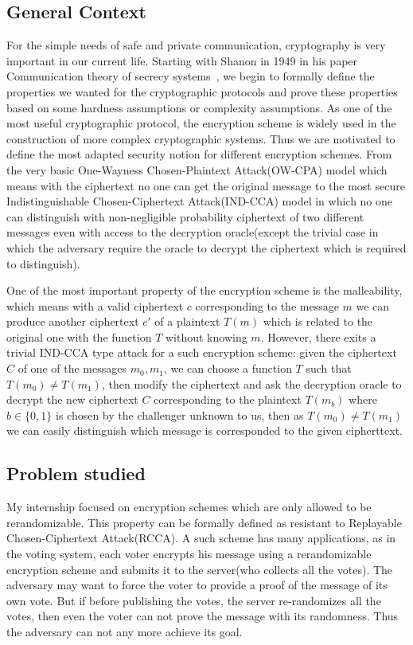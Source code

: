 \subsection*{General Context}

For the simple needs of safe and private communication, cryptography is very important in our current life. 
Starting with Shanon in 1949 in his paper Communication theory of secrecy systems~\cite{shannon-otp},
we begin to formally define the properties we wanted for the cryptographic protocols and prove these properties based on some hardness assumptions or complexity assumptions.
As one of the most useful cryptographic protocol, the encryption scheme is widely used in the construction of more complex cryptographic systems.
Thus we are motivated to define the most adapted security notion for different encryption schemes. 
From the very basic One-Wayness Chosen-Plaintext Attack(OW-CPA) model which means with the ciphertext no one can get the original message
to the most secure Indistinguishable Chosen-Ciphertext Attack(IND-CCA) model
in which no one can distinguish with non-negligible probability ciphertext of two different messages even with access to the decryption oracle(except the trivial case in which the adversary require the oracle to decrypt the ciphertext which is required to distinguish). 

One of the most important property of the encryption scheme is the malleability, 
which means with a valid ciphertext $c$ corresponding to the message $m$ we can produce another ciphertext $c'$ of a plaintext $T(m)$ which is related to the original one with the function $T$ without knowing $m$.
However, there exits a trivial IND-CCA type attack for a such encryption scheme: given the ciphertext $C$ of one of the messages $m_0, m_1$, we can choose a function $T$ such that $T(m_0) \neq T(m_1)$,
then modify the ciphertext and ask the decryption oracle to decrypt the new ciphertext $C$ corresponding to the plaintext $T(m_b)$ where $b \in \{0,1\}$ is chosen by the challenger unknown to us,
then as $T(m_0) \neq T(m_1)$ we can easily distinguish which message is corresponded to the given cipherttext.

\subsection*{Problem studied}
My internship focused on encryption schemes which are only allowed to be rerandomizable.
This property can be formally defined as resistant to Replayable Chosen-Ciphertext Attack(RCCA).
A such scheme has many applications, as in the voting system,
each voter encrypts his message using a rerandomizable encryption scheme and submits it to the server(who collects all the votes).
The adversary may want to force the voter to provide a proof of the message of its own vote.
But if before publishing the votes, the server re-randomizes all the votes,
then even the voter can not prove the message with its randomness.
Thus the adversary can not any more achieve its goal.

